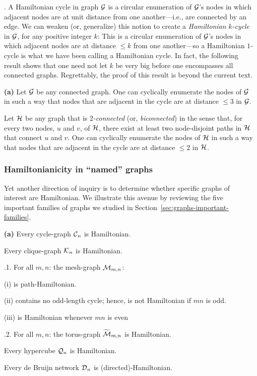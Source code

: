 .
A Hamiltonian cycle in graph $\mbox{$\cal G$}$ is a circular enumeration of $\mbox{$\cal G$}$'s
nodes in which adjacent nodes are at unit distance from one
another---i.e., are connected by an edge.  We can weaken (or,
generalize) this notion to create a {\it Hamiltonian $k$-cycle}
 in $\mbox{$\cal G$}$, for any positive integer
$k$: This is a circular enumeration of $\mbox{$\cal G$}$'s nodes in which adjacent
nodes are at distance $\leq k$ from one another---so a Hamiltonian
$1$-cycle is what we have been calling a Hamiltonian cycle.  In fact,
the following result shows that one need not let $k$ be very big
before one encompasses all connected graphs.  Regrettably, the proof
of this result is beyond the current text.

\begin{prop}
\label{thm:weak-Hamiltonianicity}
{\bf (a)} {\rm \cite{ChartrandK69}}
Let $\mbox{$\cal G$}$ be any connected graph.  One can cyclically enumerate the
nodes of $\mbox{$\cal G$}$ in such a way that nodes that are adjacent in the cycle
are at distance $\leq 3$ in $\mbox{$\cal G$}$.


 {\rm  \cite{Fleischner74}}
Let $\mbox{$\cal H$}$ be any graph that is {\em $2$-connected}
  (or, {\it
  biconnected}) in the sense that, for every two nodes, $u$ and $v$,
of $\mbox{$\cal H$}$, there exist at least two node-disjoint paths in $\mbox{$\cal H$}$ that
connect $u$ and $v$.  One can cyclically enumerate the nodes of $\mbox{$\cal H$}$
in such a way that nodes that are adjacent in the cycle are at
distance $\leq 2$ in $\mbox{$\cal H$}$.
\end{prop}

\subsubsection{Hamiltonianicity in ``named'' graphs}

Yet another direction of inquiry is to determine whether specific
graphs of interest are Hamiltonian.  We illustrate this avenue by
reviewing the five important families of graphs we studied in
Section~\ref{sec:graphs-important-families}.

\begin{prop}
\label{thm:named-graph-Hamiltonian}
{\bf (a)}
Every cycle-graph $\mbox{$\cal C$}_n$ is Hamiltonian.

Every clique-graph $\mbox{$\cal K$}_n$ is Hamiltonian.

.1.
For all $m,n$: the mesh-graph $\mbox{$\cal M$}_{m,n}$:

(i)  is path-Hamiltonian.

(ii) contains no odd-length cycle; hence, is not Hamiltonian if $mn$
is odd.

(iii) is Hamiltonian whenever $mn$ is even 

.2.
For all $m,n$: the torus-graph $\widetilde{\mbox{$\cal M$}}_{m,n}$ is Hamiltonian.

Every hypercube $\mbox{$\cal Q$}_n$  is Hamiltonian.

Every de Bruijn network $\mbox{$\cal D$}_n$ is (directed)-Hamiltonian.
\end{prop}


